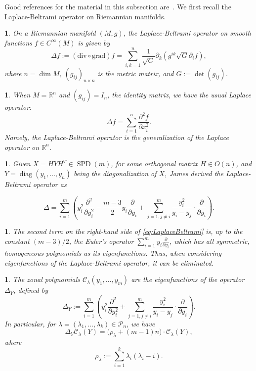 \documentclass[smallextended]{svjour3}
\newtheorem{defn}[thm]{\protect\definitionname}
\newtheorem{rem}[thm]{\protect\remarkname}
\newtheorem{prop}[thm]{\protect\propositionname}
\DeclareMathOperator{\diag}{diag}
\newcommand{\SPD}{\operatorname{SPD}}
\providecommand{\definitionname}{Definition}
\providecommand{\propositionname}{Proposition}
\providecommand{\remarkname}{Remark}
\begin{document}
Good references for the material in this subsection are~\cite{Helgason,James1,Moakher}.
We first recall the Laplace-Beltrami operator on Riemannian manifolds.
\begin{defn}
On a Riemannian manifold $(M,g)$, the Laplace-Beltrami
operator on smooth functions $f\in C^{\infty}(M)$ is given by 
\[
\Delta f:=(\mathrm{div}\circ\mathrm{grad})f=\sum_{i,k=1}^{n}\frac{1}{\sqrt{G}}\partial_{k}\left(g^{ik}\sqrt{G}\partial_{i}f\right),
\]
where $n=\dim M$, $(g_{ij})_{n\times n}$ is the metric
matrix, and $G:=\det(g_{ij})$. 
\end{defn}
\begin{rem}
When $M=\mathbb{R}^{n}$ and $(g_{ij})=I_{n}$, the identity
matrix, we have the usual Laplace operator:
\[
\Delta f=\sum_{i=1}^{n}\frac{\partial^{2}f}{\partial x_{i}^{2}}.
\]
Namely, the Laplace-Beltrami operator is the generalization of the Laplace
operator on $\mathbb{R}^{n}$. 
\end{rem}
\begin{prop}
Given $X=HY\!H^T\!\in\SPD(m)$, for some orthogonal matrix $H\in O(n)$,
and $Y=\diag(y_{1},\ldots,y_{n})$ being the diagonalization of $X$, James
\cite[eq.~3.12]{James1} derived the Laplace-Beltrami operator as

\begin{equation}
\Delta=\sum_{i=1}^{m}\left(y_{i}^{2}\frac{\partial^{2}}{\partial y_{i}^{2}}-\frac{m-3}{2}y_{i}\frac{\partial}{\partial y_{i}}+\sum_{j=1,j\neq i}^{m}\frac{y_{i}^{2}}{y_{i}-y_{j}}\cdot\frac{\partial}{\partial y_{i}}\right). \label{eq:LaplaceBeltrami}
\end{equation}
\end{prop}
\begin{rem}
The second term on the right-hand side of \eqref{eq:LaplaceBeltrami} is, up to the constant $(m-3)/2$,
the Euler's operator $\sum_{i=1}^{m}y_{i}\frac{\partial}{\partial y_{i}}$,
which has all symmetric, homogeneous polynomials as its eigenfunctions.
Thus, when considering eigenfunctions of the Laplace-Beltrami operator,
it can be eliminated.
\end{rem}
\begin{defn}
The zonal polynomials $\mathcal{C}_{\lambda}(y_{1},\ldots,y_{m})$
are the eigenfunctions of the operator $\Delta_{Y}$, defined by
\[
  \Delta_{Y}:=\sum_{i=1}^{m}\left(y_{i}^{2}\frac{\partial^{2}}{\partial y_{i}^{2}}+\sum_{j=1,j\neq i}^{m}\frac{y_{i}^{2}}{y_{i}-y_{j}}\cdot\frac{\partial}{\partial y_{i}}\right).
\]
In particular,  for $\lambda=(\lambda_1,\ldots,\lambda_k)\in\mathcal{P}_n$, we have
\[
  \Delta_{Y}\mathcal{C}_{\lambda}(Y)=\bigl(\rho_{\lambda}+(m-1)n\bigr)\cdot\mathcal{C}_{\lambda}(Y),
\]
where
\begin{equation}\label{eq:RHO}
  \rho_{\lambda}:=\sum_{i=1}^{k}\lambda_{i}\left(\lambda_{i}-i\right).
\end{equation}
\end{defn}
\end{document}
